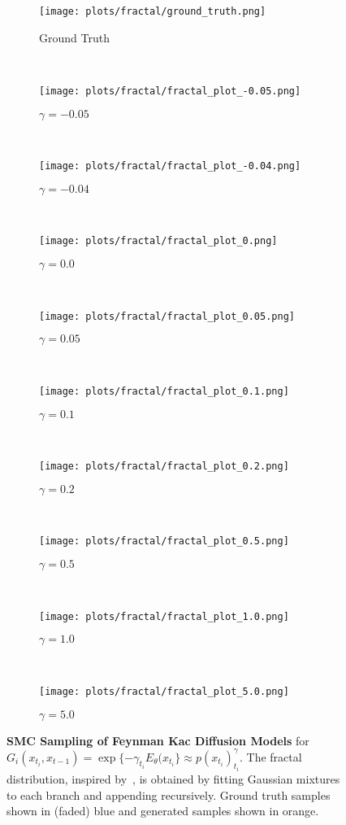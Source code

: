 \begin{figure*}[hb]
    \centering
    \begin{subfigure}[t]{0.19\textwidth}
        \centering
        \texttt{[image: plots/fractal/ground\_truth.png]}
        \caption{Ground Truth}
    \end{subfigure}%
    ~ 
    \begin{subfigure}[t]{0.19\textwidth}
        \centering
        \texttt{[image: plots/fractal/fractal\_plot\_-0.05.png]}
        \caption{$\gamma=-0.05$}
    \end{subfigure}%
    ~ 
    \begin{subfigure}[t]{0.19\textwidth}
        \centering
        \texttt{[image: plots/fractal/fractal\_plot\_-0.04.png]}
        \caption{$\gamma=-0.04$}
    \end{subfigure}%
    ~ 
    \begin{subfigure}[t]{0.19\textwidth}
        \centering
        \texttt{[image: plots/fractal/fractal\_plot\_0.png]}
        \caption{$\gamma=0.0$}
    \end{subfigure}%
    ~ 
    \begin{subfigure}[t]{0.19\textwidth}
        \centering
        \texttt{[image: plots/fractal/fractal\_plot\_0.05.png]}
        \caption{$\gamma=0.05$}
    \end{subfigure}%
    \\
    \begin{subfigure}[t]{0.19\textwidth}
        \centering
        \texttt{[image: plots/fractal/fractal\_plot\_0.1.png]}
        \caption{$\gamma=0.1$}
    \end{subfigure}%
    ~ 
    \begin{subfigure}[t]{0.19\textwidth}
        \centering
        \texttt{[image: plots/fractal/fractal\_plot\_0.2.png]}
        \caption{$\gamma=0.2$}
    \end{subfigure}%
    ~ 
    \begin{subfigure}[t]{0.19\textwidth}
        \centering
        \texttt{[image: plots/fractal/fractal\_plot\_0.5.png]}
        \caption{$\gamma=0.5$}
    \end{subfigure}%
    ~ 
    \begin{subfigure}[t]{0.19\textwidth}
        \centering
        \texttt{[image: plots/fractal/fractal\_plot\_1.0.png]}
        \caption{$\gamma=1.0$}
    \end{subfigure}%
    ~ 
    \begin{subfigure}[t]{0.19\textwidth}
        \centering
        \texttt{[image: plots/fractal/fractal\_plot\_5.0.png]}
        \caption{$\gamma=5.0$}
    \end{subfigure}%
    \caption{\textbf{SMC Sampling of Feynman Kac Diffusion Models} for $G_i(x_{t_{i}},x_{t-1})=\exp\{-\gamma_{t_i} E_\theta(x_{t_i}\}\approx p(x_{t_i})^\gamma_{t_i}$. The fractal distribution, inspired by~\citet{karras2024guiding}, is obtained by fitting Gaussian mixtures to each branch and appending recursively. Ground truth samples shown in (faded) blue and generated samples shown in orange.}   
    \label{fig:temp_tree}
\end{figure*}

